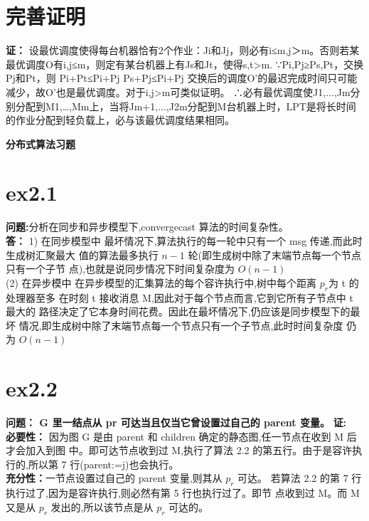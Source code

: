 \documentclass[10pt, a4paper]{article}
\begin{document}
\section{完善证明}
\textbf{证：}
设最优调度使得每台机器恰有2个作业：Ji和Jj，则必有i≤m,j＞m。否则若某最优调度O有i,j≤m，则定有某台机器上有Js和Jt，使得s,t>m.
   ∵Pi,Pj≥Ps,Pt，交换Pj和Pt，则
       Pi+Pt≤Pi+Pj         Ps+Pj≤Pi+Pj
交换后的调度O’的最迟完成时间只可能减少，故O’也是最优调度。对于i,j>m可类似证明。
∴必有最优调度使J1,...,Jm分别分配到M1,…,Mm上，当将Jm+1,...,J2m分配到M台机器上时，LPT是将长时间的作业分配到轻负载上，必与该最优调度结果相同。

\begin{center} 
\textbf{分布式算法习题}
\end{center}
\section{ex2.1}
\textbf{问题:}分析在同步和异步模型下,convergecast 算法的时间复杂性。\\
\textbf{答：}
1) 在同步模型中
最坏情况下,算法执行的每一轮中只有一个 msg 传递,而此时生成树汇聚最大
值的算法最多执行 $n-1$ 轮(即生成树中除了末端节点每一个节点只有一个子节
点),也就是说同步情况下时间复杂度为 $O(n-1)$\\
(2) 在异步模中
在异步模型的汇集算法的每个容许执行中,树中每个距离 $p_{r}$为 t 的处理器至多
在时刻 t 接收消息 M,因此对于每个节点而言,它到它所有子节点中 t 最大的
路径决定了它本身时间花费。因此在最坏情况下,仍应该是同步模型下的最坏
情况,即生成树中除了末端节点每一个节点只有一个子节点,此时时间复杂度
仍为 $O(n-1)$
\section{ex2.2}
\textbf{问题： G 里一结点从 pr 可达当且仅当它曾设置过自己的 parent 变量。}
 \textbf{证:}\\
 \textbf{必要性：}
因为图 G 是由 parent 和 children 确定的静态图,任一节点在收到 M 后才会加入到图
中。即可达节点收到过 M,执行了算法 2.2 的第五行。由于是容许执行的,所以第 7
行(parent:=j)也会执行。\\
\textbf{充分性：}一节点设置过自己的 parent 变量,则其从 $p_{r}$ 可达。
若算法 2.2 的第 7 行执行过了,因为是容许执行,则必然有第 5 行也执行过了。即节
点收到过 M。而 M 又是从 $p_{r}$ 发出的,所以该节点是从 $p_{r}$ 可达的。
\end{document}
